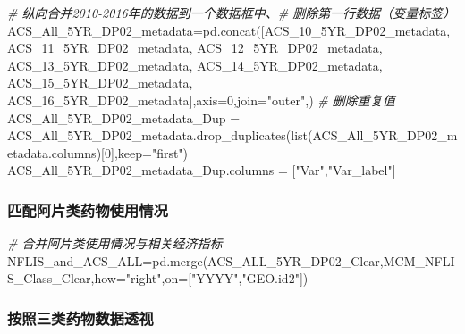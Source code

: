 \documentclass[
]{article}
\newenvironment{Shaded}{}{}
\newcommand{\BuiltInTok}[1]{#1}
\newcommand{\CommentTok}[1]{\textcolor[rgb]{0.38,0.63,0.69}{\textit{#1}}}
\newcommand{\DecValTok}[1]{\textcolor[rgb]{0.25,0.63,0.44}{#1}}
\newcommand{\NormalTok}[1]{#1}
\newcommand{\OperatorTok}[1]{\textcolor[rgb]{0.40,0.40,0.40}{#1}}
\newcommand{\StringTok}[1]{\textcolor[rgb]{0.25,0.44,0.63}{#1}}
\begin{document}
\begin{Shaded}
\begin{Highlighting}[]
\CommentTok{\# 纵向合并2010{-}2016年的数据到一个数据框中、\# 删除第一行数据（变量标签）}
\NormalTok{ACS\_All\_5YR\_DP02\_metadata}\OperatorTok{=}\NormalTok{pd.concat([ACS\_10\_5YR\_DP02\_metadata,}
\NormalTok{                           ACS\_11\_5YR\_DP02\_metadata,}
\NormalTok{                           ACS\_12\_5YR\_DP02\_metadata,}
\NormalTok{                           ACS\_13\_5YR\_DP02\_metadata,}
\NormalTok{                           ACS\_14\_5YR\_DP02\_metadata,}
\NormalTok{                           ACS\_15\_5YR\_DP02\_metadata,}
\NormalTok{                           ACS\_16\_5YR\_DP02\_metadata],axis}\OperatorTok{=}\DecValTok{0}\NormalTok{,join}\OperatorTok{=}\StringTok{"outer"}\NormalTok{,)}
\CommentTok{\# 删除重复值}
\NormalTok{ACS\_All\_5YR\_DP02\_metadata\_Dup }\OperatorTok{=}\NormalTok{ ACS\_All\_5YR\_DP02\_metadata.drop\_duplicates(}\BuiltInTok{list}\NormalTok{(ACS\_All\_5YR\_DP02\_metadata.columns)[}\DecValTok{0}\NormalTok{],keep}\OperatorTok{=}\StringTok{"first"}\NormalTok{)}
\NormalTok{ACS\_All\_5YR\_DP02\_metadata\_Dup.columns }\OperatorTok{=}\NormalTok{ [}\StringTok{"Var"}\NormalTok{,}\StringTok{"Var\_label"}\NormalTok{]}
\end{Highlighting}
\end{Shaded}

\hypertarget{header-n216}{%
\subsubsection{匹配阿片类药物使用情况}\label{header-n216}}

\begin{Shaded}
\begin{Highlighting}[]
\CommentTok{\# 合并阿片类使用情况与相关经济指标}
\NormalTok{NFLIS\_and\_ACS\_ALL}\OperatorTok{=}\NormalTok{pd.merge(ACS\_ALL\_5YR\_DP02\_Clear,MCM\_NFLIS\_Class\_Clear,how}\OperatorTok{=}\StringTok{"right"}\NormalTok{,on}\OperatorTok{=}\NormalTok{[}\StringTok{"YYYY"}\NormalTok{,}\StringTok{"GEO.id2"}\NormalTok{])}
\end{Highlighting}
\end{Shaded}

\hypertarget{header-n219}{%
\subsubsection{按照三类药物数据透视}\label{header-n219}}
\end{document}
